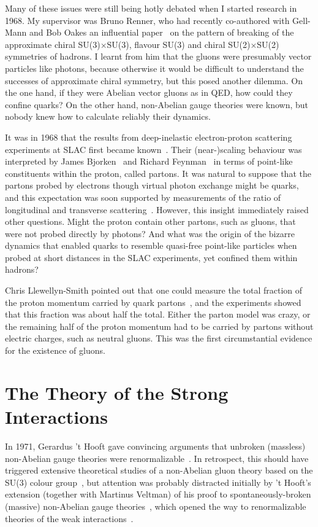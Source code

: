 \documentclass[12pt]{article} %
\begin{document}
Many of these issues were still being hotly debated when I started research in 1968.
My supervisor was Bruno Renner, who had recently co-authored with Gell-Mann and
Bob Oakes an influential paper~\cite{GOR} on the pattern of breaking of the approximate chiral
SU(3)$\times$SU(3), flavour SU(3) and chiral SU(2)$\times$SU(2) symmetries of hadrons.
I learnt from him that the gluons were presumably vector particles like photons,
because otherwise it would be difficult to understand the successes of approximate
chiral symmetry, but this posed another dilemma. On the one hand, if they were Abelian vector gluons as in QED,
how could they confine quarks? On the other hand, non-Abelian gauge theories were known,
but nobody knew how to calculate reliably their dynamics.

It was in 1968 that the results from deep-inelastic electron-proton scattering experiments at SLAC
first became known~\cite{SLAC}. Their (near-)scaling behaviour was 
interpreted by James Bjorken~\cite{Bj} and Richard Feynman~\cite{RF}
in terms of point-like constituents within the proton, called partons. It was natural to suppose
that the partons probed by electrons though virtual photon exchange
might be quarks, and this expectation was soon supported by
measurements of the ratio of longitudinal and transverse scattering~\cite{CG}.
However, this insight immediately raised other questions. Might the proton contain
other partons, such as gluons, that were not probed directly by photons? And what
was the origin of the bizarre dynamics that enabled quarks to resemble quasi-free
point-like particles when probed at short distances in the SLAC experiments, yet
confined them within hadrons?

Chris Llewellyn-Smith pointed out that one could measure the total fraction of the
proton momentum carried by quark partons~\cite{CHLS}, and the experiments showed
that this fraction was about half the total. Either the parton model was crazy, or
the remaining half of the proton momentum had to be carried by partons without
electric charges, such as neutral gluons. This was the first circumstantial
evidence for the existence of gluons.

\section{The Theory of the Strong Interactions}

In 1971, Gerardus 't Hooft gave convincing arguments that unbroken (massless)
non-Abelian gauge theories were renormalizable~\cite{tH}. In retrospect, this should have
triggered extensive theoretical studies of a non-Abelian gluon theory based on the
SU(3) colour group~\cite{BFM}, but attention was probably distracted initially by 't Hooft's extension
(together with Martinus Veltman) of his proof to spontaneously-broken (massive)
non-Abelian gauge theories~\cite{tHV}, which opened the way to renormalizable theories
of the weak interactions~\cite{SWEW}.
\end{document}
